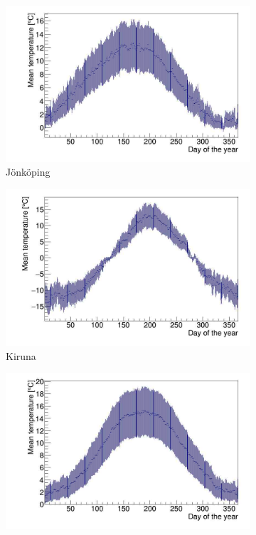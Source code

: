 \begin{figure}
    \begin{subfigure}[b]{0.49\textwidth}
    \centering
    \includegraphics[width=\textwidth]{JKP_A.jpg}
        \caption{Jönköping}
    \end{subfigure}
    \hfill
    \begin{subfigure}[b]{0.49\textwidth}
    \centering
    \includegraphics[width=\textwidth]{KIR_A.jpg}
        \caption{Kiruna}
    \end{subfigure}
    \begin{subfigure}[b]{0.49\textwidth}
    \centering
    \includegraphics[width=\textwidth]{LU_A.jpg}

\end{subfigure}
\end{figure}

